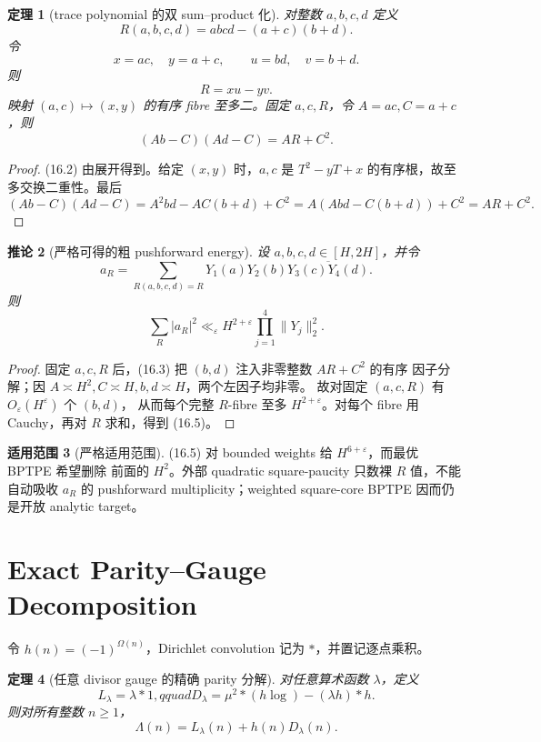 \documentclass[11pt,a4paper]{ctexart}
\newtheorem{theorem}{定理}[section]
\newtheorem{corollary}[theorem]{推论}
\theoremstyle{definition}
\newtheorem{remark}[theorem]{适用范围}
\newcommand{\1}{\mathbf 1}
\begin{document}
\begin{theorem}[trace polynomial 的双 sum--product 化]\label{thm:tool-bptrace}
对整数 $a,b,c,d$ 定义
\[
R(a,b,c,d)=abcd-(a+c)(b+d).
\tag{16.1}
\]
令
\[
x=ac,\quad y=a+c,\qquad u=bd,\quad v=b+d.
\]
则
\[
\boxed{R=xu-yv.}
\tag{16.2}
\]
映射 $(a,c)\mapsto(x,y)$ 的有序 fibre 至多二。固定 $a,c,R$，令
$A=ac,C=a+c$，则
\[
\boxed{(Ab-C)(Ad-C)=AR+C^2.}
\tag{16.3}
\]
\end{theorem}

\begin{proof}
(16.2) 由展开得到。给定 $(x,y)$ 时，$a,c$ 是
$T^2-yT+x$ 的有序根，故至多交换二重性。最后
\[
(Ab-C)(Ad-C)
=A^2bd-AC(b+d)+C^2
=A(Abd-C(b+d))+C^2=AR+C^2.
\]
\end{proof}

\begin{corollary}[严格可得的粗 pushforward energy]\label{cor:tool-crude}
设 $a,b,c,d\in[H,2H]$，并令
\[
a_R=\sum_{R(a,b,c,d)=R}
Y_1(a)Y_2(b)\overline{Y_3(c)Y_4(d)}.
\tag{16.4}
\]
则
\[
\boxed{
\sum_R|a_R|^2\ll_\varepsilon H^{2+\varepsilon}
\prod_{j=1}^4\|Y_j\|_2^2.}
\tag{16.5}
\]
\end{corollary}

\begin{proof}
固定 $a,c,R$ 后，(16.3) 把 $(b,d)$ 注入非零整数 $AR+C^2$ 的有序
因子分解；因 $A\asymp H^2,C\asymp H,b,d\asymp H$，两个左因子均非零。
故对固定 $(a,c,R)$ 有 $O_\varepsilon(H^\varepsilon)$ 个 $(b,d)$，
从而每个完整 $R$-fibre 至多 $H^{2+\varepsilon}$。对每个 fibre 用
Cauchy，再对 $R$ 求和，得到 (16.5)。
\end{proof}

\begin{remark}[严格适用范围]
(16.5) 对 bounded weights 给 $H^{6+\varepsilon}$，而最优 BPTPE 希望删除
前面的 $H^2$。外部 quadratic square-paucity 只数裸 $R$ 值，不能自动吸收
$a_R$ 的 pushforward multiplicity；weighted square-core BPTPE 因而仍是开放
analytic target。
\end{remark}

\section{Exact Parity--Gauge Decomposition}

令 $h(n)=(-1)^{\Omega(n)}$，Dirichlet convolution 记为 $*$，并置记逐点乘积。

\begin{theorem}[任意 divisor gauge 的精确 parity 分解]\label{thm:tool-epg}
对任意算术函数 $\lambda$，定义
\[
L_\lambda=\lambda*1,qquad
D_\lambda=\mu^2*(h\log)-(\lambda h)*h.                \tag{17.1}
\]
则对所有整数 $n\ge1$，
\[
\boxed{\Lambda(n)=L_\lambda(n)+h(n)D_\lambda(n).}     \tag{EPG}
\]
\end{theorem}
\end{document}
